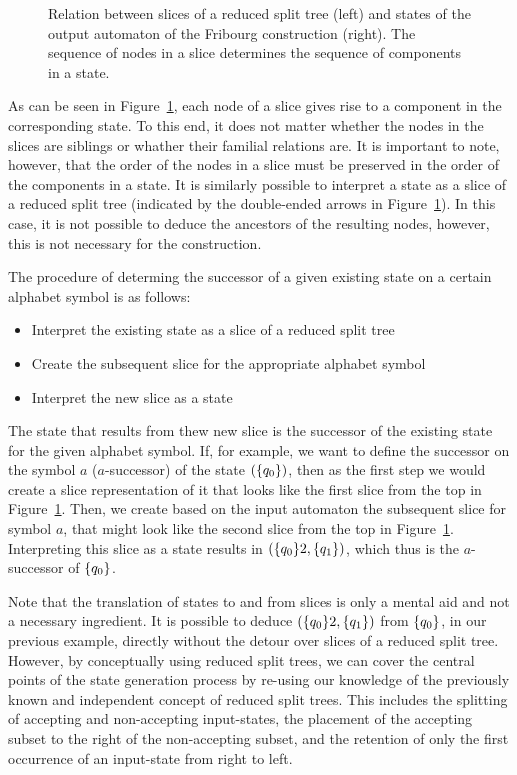 \begin{figure}[htb]
\centering
\Slices
\caption{Relation between slices of a reduced split tree (left) and states of the output automaton of the Fribourg construction (right). The sequence of nodes in a slice determines the sequence of components in a state.}
\label{slices}
\end{figure}

As can be seen in Figure~\ref{slices}, each node of a slice gives rise to a component in the corresponding state. To this end, it does not matter whether the nodes in the slices are siblings or whather their familial relations are. It is important to note, however, that the order of the nodes in a slice must be preserved in the order of the components in a state. It is similarly possible to interpret a state as a slice of a reduced split tree (indicated by the double-ended arrows in Figure~\ref{slices}). In this case, it is not possible to deduce the ancestors of the resulting nodes, however, this is not necessary for the construction.

The procedure of determing the successor of a given existing state on a certain alphabet symbol is as follows:
\begin{itemize}
\item Interpret the existing state as a slice of a reduced split tree
\item Create the subsequent slice for the appropriate alphabet symbol
\item Interpret the new slice as a state
\end{itemize}
The state that results from thew new slice is the successor of the existing state for the given alphabet symbol. If, for example, we want to define the successor on the symbol $a$ ($a$-successor) of the state $(\{q_{0}\})$, then as the first step we would create a slice representation of it that looks like the first slice from the top in Figure~\ref{slices}. Then, we create based on the input automaton the subsequent slice for symbol $a$, that might look like the second slice from the top in Figure~\ref{slices}. Interpreting this slice as a state results in $(\{q_{0}\}2,\{q_{1}\})$, which thus is the $a$-successor of $\{q_{0}\}$.

Note that the translation of states to and from slices is only a mental aid and not a necessary ingredient. It is possible to deduce $(\{q_{0}\}2,\{q_{1}\})$ from $\{q_{0}\}$, in our previous example, directly without the detour over slices of a reduced split tree. However, by conceptually using reduced split trees, we can cover the central points of the state generation process by re-using our knowledge of the previously known and independent concept of reduced split trees. This includes the splitting of accepting and non-accepting input-states, the placement of the accepting subset to the right of the non-accepting subset, and the retention of only the first occurrence of an input-state from right to left.




